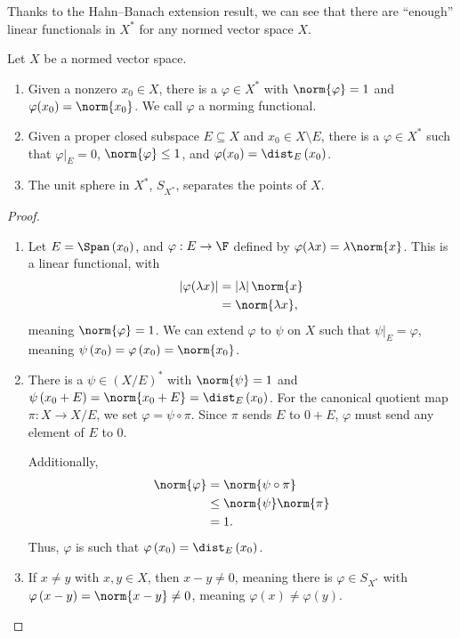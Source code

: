 \documentclass[10pt]{mypackage}
\begin{document}
  Thanks to the Hahn--Banach extension result, we can see that there are ``enough'' linear functionals in $X^{\ast}$ for any normed vector space $X$.
  \begin{theorem}
    Let $X$ be a normed vector space.
    \begin{enumerate}[(1)]
      \item Given a nonzero $x_0\in X$, there is a $\varphi\in X^{\ast}$ with $\norm{\varphi} = 1$ and $\varphi(x_0) = \norm{x_0}$. We call $\varphi$ a norming functional.
      \item Given a proper closed subspace $E\subseteq X$ and $x_0\in X\setminus E$, there is a $\varphi\in X^{\ast}$ such that $\varphi|_{E} = 0$, $\norm{\varphi} \leq 1$, and $\varphi(x_0) = \dist_{E}\left(x_0\right)$.
      \item The unit sphere in $X^{\ast}$, $S_{X^{\ast}}$, separates the points of $X$.
    \end{enumerate}
  \end{theorem}
  \begin{proof}\hfill
    \begin{enumerate}[(1)]
      \item Let $E = \Span\left(x_0\right)$, and $\varphi: E\rightarrow \F$ defined by $\varphi(\lambda x) = \lambda\norm{x}$. This is a linear functional, with
        \begin{align*}
          \left\vert \varphi(\lambda x) \right\vert &= \left\vert \lambda \right\vert\norm{x}\\
                                                    &= \norm{\lambda x},
        \end{align*}
        meaning $\norm{\varphi} = 1$. We can extend $\varphi$ to $\psi$ on $X$ such that $\psi|_{E} = \varphi$, meaning $\psi\left(x_0\right) = \varphi\left(x_0\right) = \norm{x_0}$.
      \item There is a $\psi\in \left(X/E\right)^{\ast}$ with $\norm{\psi} = 1$ and $\psi\left(x_0 + E\right) = \norm{x_0 + E} = \dist_{E}\left(x_0\right)$. For the canonical quotient map $\pi: X\rightarrow X/E$, we set $\varphi = \psi\circ\pi$. Since $\pi$ sends $E$ to $0 + E$, $\varphi$ must send any element of $E$ to $0$.\newline

        Additionally,
        \begin{align*}
          \norm{\varphi} &= \norm{\psi\circ\pi}\\
                         &\leq \norm{\psi}\norm{\pi}\\
                         &= 1.
        \end{align*}
        Thus, $\varphi$ is such that $\varphi\left(x_0\right) = \dist_{E}\left(x_0\right)$.
      \item If $x\neq y$ with $x,y\in X$, then $x-y\neq 0$, meaning there is $\varphi\in S_{X^{\ast}}$ with $\varphi\left(x-y\right) = \norm{x-y}\neq 0$, meaning $\varphi(x)\neq \varphi(y)$.
    \end{enumerate}
  \end{proof}
\end{document}
